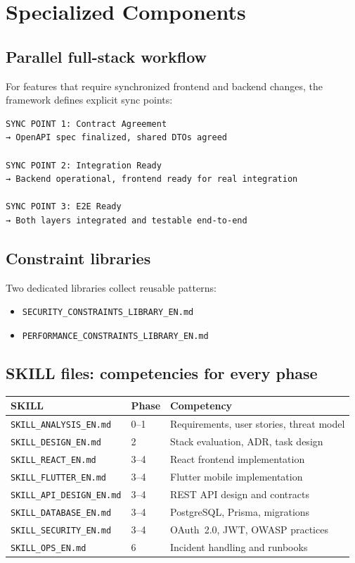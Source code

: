 \section{Specialized Components}

\subsection{Parallel full-stack workflow}
For features that require synchronized frontend and backend changes, the framework defines explicit sync points:
\begin{lstlisting}[language={}]
SYNC POINT 1: Contract Agreement
→ OpenAPI spec finalized, shared DTOs agreed

SYNC POINT 2: Integration Ready
→ Backend operational, frontend ready for real integration

SYNC POINT 3: E2E Ready
→ Both layers integrated and testable end-to-end
\end{lstlisting}

\subsection{Constraint libraries}
Two dedicated libraries collect reusable patterns:
\begin{itemize}
  \item \texttt{SECURITY\_CONSTRAINTS\_LIBRARY\_EN.md}
  \item \texttt{PERFORMANCE\_CONSTRAINTS\_LIBRARY\_EN.md}
\end{itemize}

\subsection{SKILL files: competencies for every phase}

\begin{center}
\begin{small}
\begin{tabularx}{\textwidth}{l l X}
\toprule
\textbf{SKILL} & \textbf{Phase} & \textbf{Competency} \\
\midrule
\texttt{SKILL\_ANALYSIS\_EN.md} & 0--1 & Requirements, user stories, threat model \\
\texttt{SKILL\_DESIGN\_EN.md} & 2 & Stack evaluation, ADR, task design \\
\texttt{SKILL\_REACT\_EN.md} & 3--4 & React frontend implementation \\
\texttt{SKILL\_FLUTTER\_EN.md} & 3--4 & Flutter mobile implementation \\
\texttt{SKILL\_API\_DESIGN\_EN.md} & 3--4 & REST API design and contracts \\
\texttt{SKILL\_DATABASE\_EN.md} & 3--4 & PostgreSQL, Prisma, migrations \\
\texttt{SKILL\_SECURITY\_EN.md} & 3--4 & OAuth~2.0, JWT, OWASP practices \\
\texttt{SKILL\_OPS\_EN.md} & 6 & Incident handling and runbooks \\
\bottomrule
\end{tabularx}
\end{small}
\end{center}

